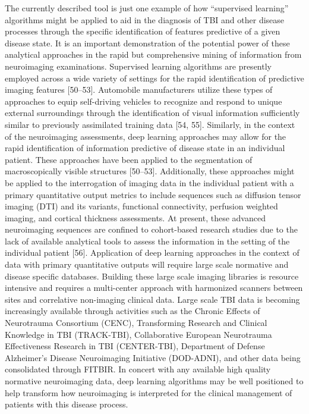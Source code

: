 \documentclass[11pt,]{article}
\begin{document}
The currently described tool is just one example of how ``supervised
learning'' algorithms might be applied to aid in the diagnosis of TBI
and other disease processes through the specific identification of
features predictive of a given disease state. It is an important
demonstration of the potential power of these analytical approaches in
the rapid but comprehensive mining of information from neuroimaging
examinations. Supervised learning algorithms are presently employed
across a wide variety of settings for the rapid identification of
predictive imaging features {[}50--53{]}. Automobile manufacturers
utilize these types of approaches to equip self-driving vehicles to
recognize and respond to unique external surroundings through the
identification of visual information sufficiently similar to previously
assimilated training data {[}54, 55{]}. Similarly, in the context of the
neuroimaging assessments, deep learning approaches may allow for the
rapid identification of information predictive of disease state in an
individual patient. These approaches have been applied to the
segmentation of macroscopically visible structures {[}50--53{]}.
Additionally, these approaches might be applied to the interrogation of
imaging data in the individual patient with a primary quantitative
output metrics to include sequences such as diffusion tensor imaging
(DTI) and its variants, functional connectivity, perfusion weighted
imaging, and cortical thickness assessments. At present, these advanced
neuroimaging sequences are confined to cohort-based research studies due
to the lack of available analytical tools to assess the information in
the setting of the individual patient {[}56{]}. Application of deep
learning approaches in the context of data with primary quantitative
outputs will require large scale normative and disease specific
databases. Building these large scale imaging libraries is resource
intensive and requires a multi-center approach with harmonized scanners
between sites and correlative non-imaging clinical data. Large scale TBI
data is becoming increasingly available through activities such as the
Chronic Effects of Neurotrauma Consortium (CENC), Transforming Research
and Clinical Knowledge in TBI (TRACK-TBI), Collaborative European
Neurotrauma Effectiveness Research in TBI (CENTER-TBI), Department of
Defense Alzheimer's Disease Neuroimaging Initiative (DOD-ADNI), and
other data being consolidated through FITBIR. In concert with any
available high quality normative neuroimaging data, deep learning
algorithms may be well positioned to help transform how neuroimaging is
interpreted for the clinical management of patients with this disease
process.
\end{document}
